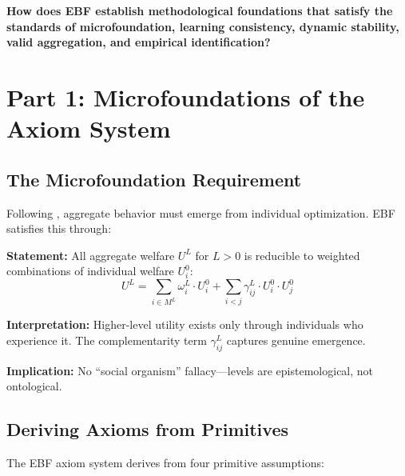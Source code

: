 \begin{tcolorbox}[colback=red!5!white, colframe=red!75!black,
    title=The Fundamental Question]
\textbf{How does EBF establish methodological foundations that satisfy
the standards of microfoundation, learning consistency, dynamic stability,
valid aggregation, and empirical identification?}
\end{tcolorbox}


\section{Part 1: Microfoundations of the Axiom System}
\label{sec:az-micro}

\subsection{The Microfoundation Requirement}

Following \citet{lucas1976econometric}, aggregate behavior must emerge from
individual optimization. EBF satisfies this through:

\begin{tcolorbox}[colback=gray!5!white, colframe=gray!75!black,
    title=Axiom AZ-M1: Methodological Individualism with Levels]
\textbf{Statement:} All aggregate welfare $U^L$ for $L > 0$ is reducible to
weighted combinations of individual welfare $U^0_i$:
\begin{equation}
U^L = \sum_{i \in M^L} \omega^L_i \cdot U^0_i + \sum_{i < j} \gamma^L_{ij} \cdot U^0_i \cdot U^0_j
\end{equation}

\textbf{Interpretation:} Higher-level utility exists only through individuals who
experience it. The complementarity term $\gamma^L_{ij}$ captures genuine emergence.

\textbf{Implication:} No ``social organism'' fallacy---levels are epistemological,
not ontological.
\end{tcolorbox}

\subsection{Deriving Axioms from Primitives}

The EBF axiom system derives from four primitive assumptions:

